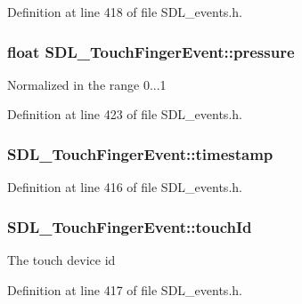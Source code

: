 Definition at line 418 of file S\-D\-L\-\_\-events.\-h.

\hypertarget{struct_s_d_l___touch_finger_event_ab4fca822d0807b5748dbae8d3cc56524}{
\subsubsection[{pressure}]{\setlength{\rightskip}{0pt plus 5cm}float S\-D\-L\-\_\-\-Touch\-Finger\-Event\-::pressure}}\label{struct_s_d_l___touch_finger_event_ab4fca822d0807b5748dbae8d3cc56524}
Normalized in the range 0...1 

Definition at line 423 of file S\-D\-L\-\_\-events.\-h.

\hypertarget{struct_s_d_l___touch_finger_event_abde2ab5cb013bbd21e37a65e2f8fa666}{
\subsubsection[{timestamp}]{ S\-D\-L\-\_\-\-Touch\-Finger\-Event\-::timestamp}}\label{struct_s_d_l___touch_finger_event_abde2ab5cb013bbd21e37a65e2f8fa666}


Definition at line 416 of file S\-D\-L\-\_\-events.\-h.

\hypertarget{struct_s_d_l___touch_finger_event_ad7a6f39ec9af1bf47b160d18314edd70}{
\subsubsection[{touch\-Id}]{ S\-D\-L\-\_\-\-Touch\-Finger\-Event\-::touch\-Id}}\label{struct_s_d_l___touch_finger_event_ad7a6f39ec9af1bf47b160d18314edd70}
The touch device id 

Definition at line 417 of file S\-D\-L\-\_\-events.\-h.

